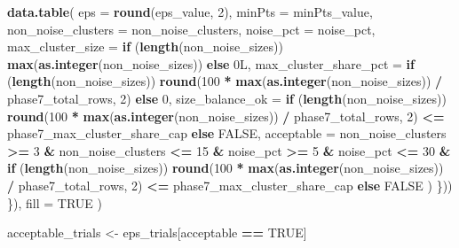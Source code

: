 \documentclass[
]{article}
\newenvironment{Shaded}{\begin{snugshade}}{\end{snugshade}}
\newcommand{\AttributeTok}[1]{\textcolor[rgb]{0.13,0.29,0.53}{#1}}
\newcommand{\ConstantTok}[1]{\textcolor[rgb]{0.56,0.35,0.01}{#1}}
\newcommand{\ControlFlowTok}[1]{\textcolor[rgb]{0.13,0.29,0.53}{\textbf{#1}}}
\newcommand{\DataTypeTok}[1]{\textcolor[rgb]{0.13,0.29,0.53}{#1}}
\newcommand{\DecValTok}[1]{\textcolor[rgb]{0.00,0.00,0.81}{#1}}
\newcommand{\FunctionTok}[1]{\textcolor[rgb]{0.13,0.29,0.53}{\textbf{#1}}}
\newcommand{\NormalTok}[1]{#1}
\newcommand{\OtherTok}[1]{\textcolor[rgb]{0.56,0.35,0.01}{#1}}
\newcommand{\SpecialCharTok}[1]{\textcolor[rgb]{0.81,0.36,0.00}{\textbf{#1}}}
\begin{document}
\begin{Shaded}
\begin{Highlighting}[]
      \FunctionTok{data.table}\NormalTok{(}
        \AttributeTok{eps =} \FunctionTok{round}\NormalTok{(eps\_value, }\DecValTok{2}\NormalTok{),}
        \AttributeTok{minPts =}\NormalTok{ minPts\_value,}
        \AttributeTok{non\_noise\_clusters =}\NormalTok{ non\_noise\_clusters,}
        \AttributeTok{noise\_pct =}\NormalTok{ noise\_pct,}
        \AttributeTok{max\_cluster\_size =} \ControlFlowTok{if}\NormalTok{ (}\FunctionTok{length}\NormalTok{(non\_noise\_sizes)) }\FunctionTok{max}\NormalTok{(}\FunctionTok{as.integer}\NormalTok{(non\_noise\_sizes)) }\ControlFlowTok{else} \DecValTok{0}\DataTypeTok{L}\NormalTok{,}
        \AttributeTok{max\_cluster\_share\_pct =} \ControlFlowTok{if}\NormalTok{ (}\FunctionTok{length}\NormalTok{(non\_noise\_sizes)) }\FunctionTok{round}\NormalTok{(}\DecValTok{100} \SpecialCharTok{*} \FunctionTok{max}\NormalTok{(}\FunctionTok{as.integer}\NormalTok{(non\_noise\_sizes)) }\SpecialCharTok{/}\NormalTok{ phase7\_total\_rows, }\DecValTok{2}\NormalTok{) }\ControlFlowTok{else} \DecValTok{0}\NormalTok{,}
        \AttributeTok{size\_balance\_ok =} \ControlFlowTok{if}\NormalTok{ (}\FunctionTok{length}\NormalTok{(non\_noise\_sizes)) }\FunctionTok{round}\NormalTok{(}\DecValTok{100} \SpecialCharTok{*} \FunctionTok{max}\NormalTok{(}\FunctionTok{as.integer}\NormalTok{(non\_noise\_sizes)) }\SpecialCharTok{/}\NormalTok{ phase7\_total\_rows, }\DecValTok{2}\NormalTok{) }\SpecialCharTok{\textless{}=}\NormalTok{ phase7\_max\_cluster\_share\_cap }\ControlFlowTok{else} \ConstantTok{FALSE}\NormalTok{,}
        \AttributeTok{acceptable =}\NormalTok{ non\_noise\_clusters }\SpecialCharTok{\textgreater{}=} \DecValTok{3} \SpecialCharTok{\&}\NormalTok{ non\_noise\_clusters }\SpecialCharTok{\textless{}=} \DecValTok{15} \SpecialCharTok{\&}\NormalTok{ noise\_pct }\SpecialCharTok{\textgreater{}=} \DecValTok{5} \SpecialCharTok{\&}\NormalTok{ noise\_pct }\SpecialCharTok{\textless{}=} \DecValTok{30} \SpecialCharTok{\&}
          \ControlFlowTok{if}\NormalTok{ (}\FunctionTok{length}\NormalTok{(non\_noise\_sizes)) }\FunctionTok{round}\NormalTok{(}\DecValTok{100} \SpecialCharTok{*} \FunctionTok{max}\NormalTok{(}\FunctionTok{as.integer}\NormalTok{(non\_noise\_sizes)) }\SpecialCharTok{/}\NormalTok{ phase7\_total\_rows, }\DecValTok{2}\NormalTok{) }\SpecialCharTok{\textless{}=}\NormalTok{ phase7\_max\_cluster\_share\_cap }\ControlFlowTok{else} \ConstantTok{FALSE}
\NormalTok{      )}
\NormalTok{    \}))}
\NormalTok{  \}),}
  \AttributeTok{fill =} \ConstantTok{TRUE}
\NormalTok{)}

\NormalTok{acceptable\_trials }\OtherTok{\textless{}{-}}\NormalTok{ eps\_trials[acceptable }\SpecialCharTok{==} \ConstantTok{TRUE}\NormalTok{]}


\end{Highlighting}
\end{Shaded}
\end{document}
